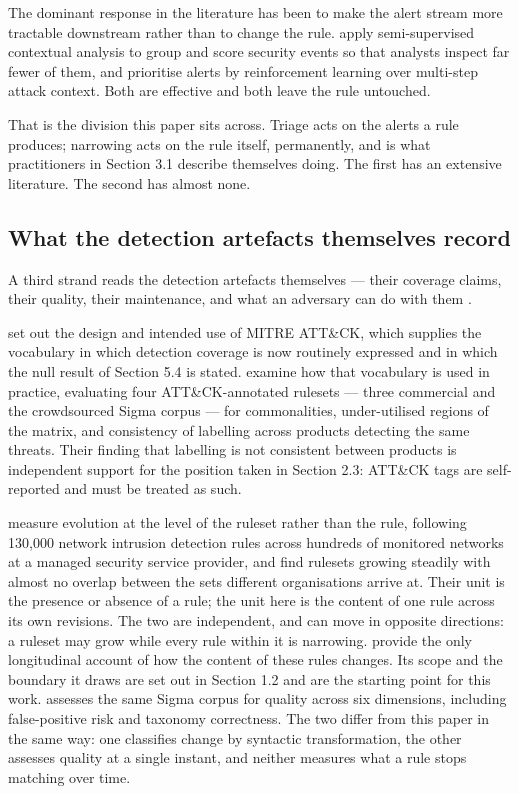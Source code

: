 The dominant response in the literature has been to make the alert stream more tractable downstream rather than to change the rule. \citet{vanede2022} apply semi-supervised contextual analysis to group and score security events so that analysts inspect far fewer of them, and \citet{wang2024} prioritise alerts by reinforcement learning over multi-step attack context. Both are effective and both leave the rule untouched.

That is the division this paper sits across. Triage acts on the alerts a rule produces; narrowing acts on the rule itself, permanently, and is what practitioners in Section 3.1 describe themselves doing. The first has an extensive literature. The second has almost none.

\subsection{What the detection artefacts themselves record}

A third strand reads the detection artefacts themselves --- their coverage claims, their quality, their maintenance, and what an adversary can do with them \citep{strom2020,decan2018,vermeer2022,uetz2024,virkud2024,long2026,tyagi2026,dectot2026}.

\citet{strom2020} set out the design and intended use of MITRE ATT\&CK, which supplies the vocabulary in which detection coverage is now routinely expressed and in which the null result of Section 5.4 is stated. \citet{virkud2024} examine how that vocabulary is used in practice, evaluating four ATT\&CK-annotated rulesets --- three commercial and the crowdsourced Sigma corpus --- for commonalities, under-utilised regions of the matrix, and consistency of labelling across products detecting the same threats. Their finding that labelling is not consistent between products is independent support for the position taken in Section 2.3: ATT\&CK tags are self-reported and must be treated as such.

\citet{vermeer2022} measure evolution at the level of the ruleset rather than the rule, following 130,000 network intrusion detection rules across hundreds of monitored networks at a managed security service provider, and find rulesets growing steadily with almost no overlap between the sets different organisations arrive at. Their unit is the presence or absence of a rule; the unit here is the content of one rule across its own revisions. The two are independent, and can move in opposite directions: a ruleset may grow while every rule within it is narrowing. \citet{long2026} provide the only longitudinal account of how the content of these rules changes. Its scope and the boundary it draws are set out in Section 1.2 and are the starting point for this work. \citet{tyagi2026} assesses the same Sigma corpus for quality across six dimensions, including false-positive risk and taxonomy correctness. The two differ from this paper in the same way: one classifies change by syntactic transformation, the other assesses quality at a single instant, and neither measures what a rule stops matching over time.

